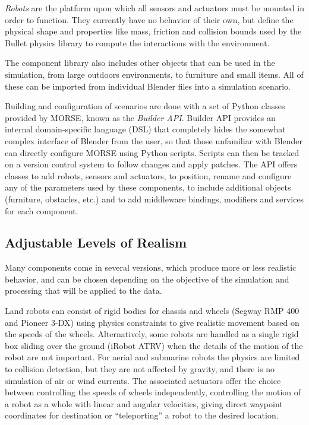 \documentclass{llncs}
\begin{document}
\emph{Robots} are the platform upon which all sensors and actuators must be mounted in
order to function. They currently have no behavior of their own, but define the
physical shape and properties like mass, friction and collision bounds
used by the Bullet physics library to compute the interactions with
the environment.

The component library also includes other objects that can be used in the
simulation, from large outdoors environments, to furniture and small items.
All of these can be imported from individual Blender files into a simulation
scenario.

Building and configuration of scenarios are done with a set of Python
classes provided by MORSE, known as the \emph{Builder API}. 
Builder API provides an internal domain-specific language (DSL) that completely
hides the somewhat complex interface of Blender from the user, so that those
unfamiliar with Blender can directly configure MORSE using Python scripts.
Scripts can then be tracked on a version control system to follow changes and
apply patches.
The API offers classes to add robots, sensors and actuators, to position,
rename and configure any of the parameters used by these components, to
include additional objects (furniture, obstacles, etc.) and to add middleware
bindings, modifiers and services for each component.

\subsection{Adjustable Levels of Realism}
\label{section:realism}

Many components come in several versions, which produce more or less
realistic behavior, and can be chosen depending on the objective of the
simulation and processing that will be applied to the data.

Land robots can consist of rigid bodies for chassis and wheels (Segway RMP 400
and Pioneer 3-DX) using physics constraints to give realistic movement based on
the speeds of the wheels. Alternatively, some robots are handled as a single
rigid box sliding over the ground (iRobot ATRV) when the details of the motion
of the robot are not important. For aerial and submarine robots the
physics are limited to collision detection, but they are not affected by
gravity, and there is no simulation of air or wind currents.
The associated actuators offer the choice between controlling the
speeds of wheels independently, controlling the motion of a robot as a whole
with linear and angular velocities, giving direct waypoint coordinates for
destination or ``teleporting'' a robot to the desired location.
\end{document}
